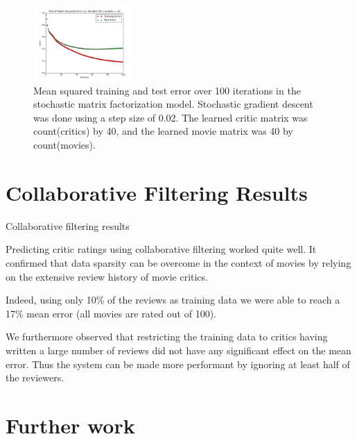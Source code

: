 \documentclass[12pt]{article}
\newcommand{\plotwidth}{0.34}
\begin{document}
\begin{figure}[H]
	\includegraphics[width=\plotwidth\textwidth]{matrix_plots/test-i100d40l10.png}
	\caption{Mean squared training and test error over 100 iterations in the stochastic matrix factorization model. Stochastic gradient descent was done using a step size of 0.02. The learned critic matrix was count(critics) by 40, and the learned movie matrix was 40 by count(movies).}
	\label{fig:40}
	\end{figure}

\section{Collaborative Filtering Results}


Collaborative filtering results

Predicting critic ratings using collaborative filtering worked quite well. It confirmed that data sparsity can be overcome in the context of movies by relying on the extensive review history of movie critics.

Indeed, using only 10\% of the reviews as training data we were able to reach a 17\% mean error (all movies are rated out of 100).

We furthermore observed that restricting the training data to critics having written a large number of reviews did not have any significant effect on the mean error. Thus the system can be made more performant by ignoring at least half of the reviewers.


\section{Further work}
\end{document}
